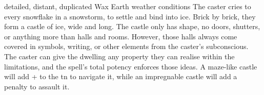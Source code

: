   {detailed, distant, duplicated}%
  {Wax}%
  {Earth}%
  {weather conditions}%
  {The caster cries to every snowflake in a snowstorm, to settle and bind into ice.
    Brick by brick, they form a castle of ice,  wide and long.
  }%
  {
    The castle only has shape, no doors, shutters, or anything more than halls and rooms.
    However, those halls always come covered in symbols, writing, or other elements from the caster's subconscious.
    The caster can give the dwelling any property they can realise within the limitations, and the spell's total potency enforces those ideas.
    A maze-like castle will add + to the \gls{tn} to navigate it, while an impregnable castle will add a penalty to assault it.
  }

